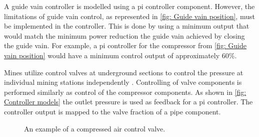 		\par
		A guide vain controller is modelled using a \gls{pi} controller component. However, the limitations of guide vain control, as represented in \cref{fig: Guide vain position}, must be implemented in the controller. This is done by using a minimum output that would match the minimum power reduction the guide vain achieved by closing the guide vain. For example, a \gls{pi} controller for the compressor from \cref{fig: Guide vain position} would have a minimum control output of approximately 60\%.
		\par 
		Mines utilize control valves at underground sections to control the pressure at individual mining stations independently \cite{Heyns2014Masters}. Controlling of valve components is performed similarly as control of the compressor components. As shown in \cref{fig: Controller models} the outlet pressure is used as feedback for a pi controller. The controller output is mapped to the valve fraction of a pipe component.
		\begin{figure}[h]
			\centering
			\caption[An example of a compressed air control valve.]{An example of a compressed air control valve\cite{van2015implementation}.} 
			\label{fig: Control}
		\end{figure}
